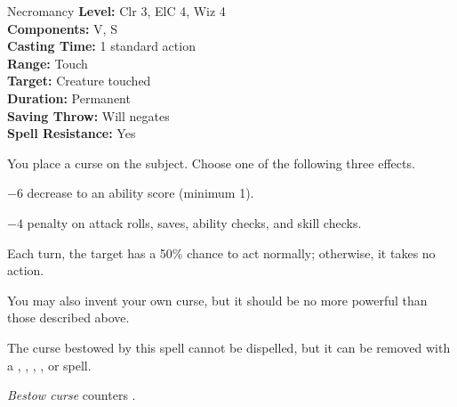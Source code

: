 {Necromancy}
{
	\textbf{Level:}
	Clr 3, ElC 4, Wiz 4\\
	\textbf{Components:}
	V, S\\
	\textbf{Casting Time:}
	1 standard action\\
	\textbf{Range:}
	Touch\\
	\textbf{Target:}
	Creature touched\\
	\textbf{Duration:}
	Permanent\\
	\textbf{Saving Throw:}
	Will negates\\
	\textbf{Spell Resistance:}
	Yes\\
}
{
	You place a curse on the subject. Choose one of the following three effects.
\begin{itemize*}
\item $-6$ decrease to an ability score (minimum 1).
\item $-4$ penalty on attack rolls, saves, ability checks, and skill checks.
\item Each turn, the target has a 50\% chance to act normally; otherwise, it takes no action.
\end{itemize*}

	You may also invent your own curse, but it should be no more powerful than those described above.

	The curse bestowed by this spell cannot be dispelled, but it can be removed with a , , , , or  spell.

	\emph{Bestow curse} counters .

}

